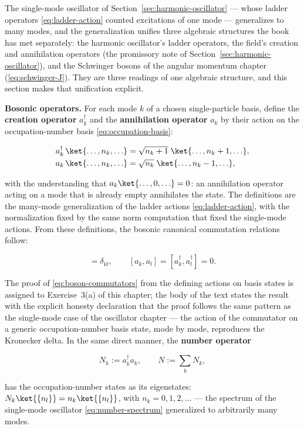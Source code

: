The single-mode oscillator of Section~\ref{sec:harmonic-oscillator} --- whose ladder operators \eqref{eq:ladder-action} counted excitations of one mode --- generalizes to many modes, and the generalization unifies three algebraic structures the book has met separately: the harmonic oscillator's ladder operators, the field's creation and annihilation operators (the promissory note of Section~\ref{sec:harmonic-oscillator}), and the Schwinger bosons of the angular momentum chapter (\eqref{eq:schwinger-J}). They are three readings of one algebraic structure, and this section makes that unification explicit.

\medskip\noindent\textbf{Bosonic operators.}
For each mode $k$ of a chosen single-particle basis, define the \textbf{creation operator} $a_k^\dagger$ and the \textbf{annihilation operator} $a_k$ by their action on the occupation-number basis \eqref{eq:occupation-basis}:
\begin{linenomath}
    \begin{align}
        a_k^\dagger\,\ket{\ldots, n_k, \ldots}
        &= \sqrt{n_k + 1}\;\ket{\ldots, n_k + 1, \ldots}, \\
        a_k\,\ket{\ldots, n_k, \ldots}
        &= \sqrt{n_k}\;\ket{\ldots, n_k - 1, \ldots},
    \end{align}
\end{linenomath}
with the understanding that $a_k\ket{\ldots, 0, \ldots} = 0$: an annihilation operator acting on a mode that is already empty annihilates the state. The definitions are the many-mode generalization of the ladder actions \eqref{eq:ladder-action}, with the normalization fixed by the same norm computation that fixed the single-mode actions. From these definitions, the bosonic canonical commutation relations follow:
\begin{linenomath}
    \begin{equation}
        [a_k, a_l^\dagger] = \delta_{kl},
        \qquad
        [a_k, a_l] = [a_k^\dagger, a_l^\dagger] = 0.
        \label{eq:boson-commutators}
    \end{equation}
\end{linenomath}
The proof of \eqref{eq:boson-commutators} from the defining actions on basis states is assigned to Exercise~3(a) of this chapter; the body of the text states the result with the explicit honesty declaration that the proof follows the same pattern as the single-mode case of the oscillator chapter --- the action of the commutator on a generic occupation-number basis state, mode by mode, reproduces the Kronecker delta. In the same direct manner, the \textbf{number operator}
\begin{linenomath}
    \begin{equation}
        N_k := a_k^\dagger a_k,
        \qquad
        N := \sum_k N_k,
        \label{eq:number-operator}
    \end{equation}
\end{linenomath}
has the occupation-number states as its eigenstates: $N_k\ket{\{n_l\}} = n_k\ket{\{n_l\}}$, with $n_k = 0, 1, 2, \ldots$ --- the spectrum of the single-mode oscillator \eqref{eq:number-spectrum} generalized to arbitrarily many modes.

